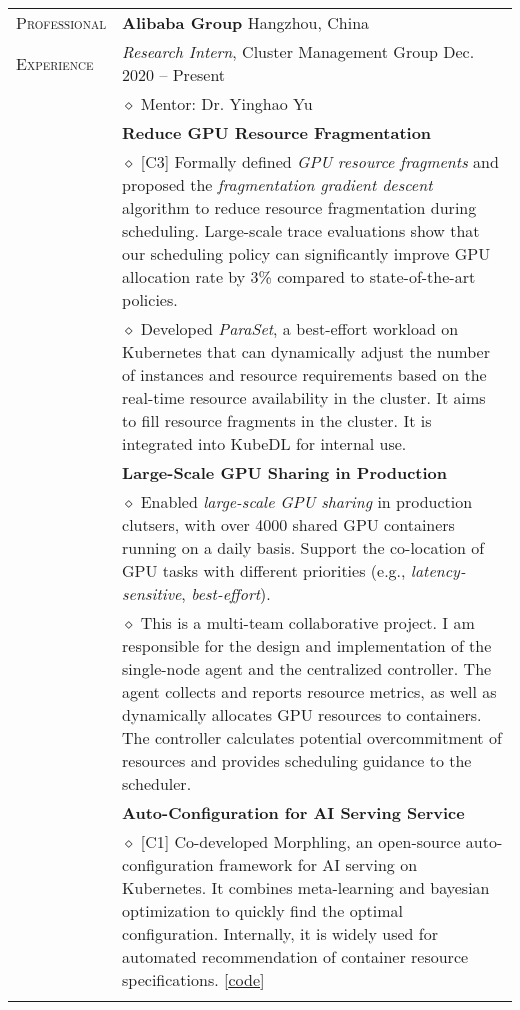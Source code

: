 \documentclass[letterpaper, 11pt]{article}
\begin{document}
\begin{longtable}{p{1in}p{5in}}
{\textsc{Professional}}
& {\textbf{Alibaba Group}} \hfill Hangzhou, China \\
{\textsc{Experience}}
& \textit{Research Intern}, Cluster Management Group \hfill Dec. 2020 -- Present \\
& $\diamond$ Mentor: Dr. Yinghao Yu \\
& \textbf{Reduce GPU Resource Fragmentation} \\
    & $\diamond$ [C3] Formally defined \textit{GPU resource fragments} and proposed the \textit{fragmentation gradient descent} algorithm to reduce resource fragmentation during scheduling. Large-scale trace evaluations show that our scheduling policy can significantly improve GPU allocation rate by 3\% compared to state-of-the-art policies. \\
    & $\diamond$ Developed \textit{ParaSet}, a best-effort workload on Kubernetes that can dynamically adjust the number of instances and resource requirements based on the real-time resource availability in the cluster. It aims to fill resource fragments in the cluster. It is integrated into KubeDL for internal use. \\
& \textbf{Large-Scale GPU Sharing in Production} \\
    & $\diamond$ Enabled \textit{large-scale GPU sharing} in production clutsers, with over 4000 shared GPU containers running on a daily basis. Support the co-location of GPU tasks with different priorities (e.g., \textit{latency-sensitive}, \textit{best-effort}). \\
    & $\diamond$ This is a multi-team collaborative project. I am responsible for the design and implementation of the single-node agent and the centralized controller. The agent collects and reports resource metrics, as well as dynamically allocates GPU resources to containers. The controller calculates potential overcommitment of resources and provides scheduling guidance to the scheduler. \\
& \textbf{Auto-Configuration for AI Serving Service} \\
    & $\diamond$ [C1] Co-developed Morphling, an open-source auto-configuration framework for AI serving on Kubernetes. It combines meta-learning and bayesian optimization to quickly find the optimal configuration. Internally, it is widely used for automated recommendation of container resource specifications. [\href{https://github.com/kubedl-io/morphling}{\underline{code}}] \\
& \\


\end{longtable}
\end{document}
